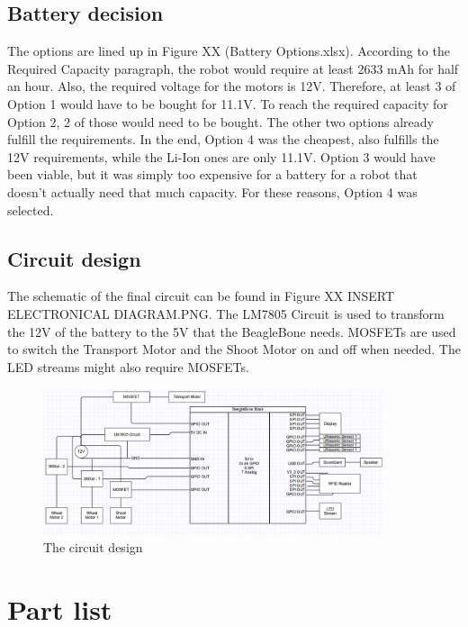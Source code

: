 \documentclass[11pt,twoside,a4paper]{report}
\begin{document}
\subsection{Battery decision}
The options are lined up in Figure XX (Battery Options.xlsx). According to the Required Capacity paragraph, the robot would require at least 2633 mAh for half an hour. Also, the required voltage for the motors is 12V. Therefore, at least 3 of Option 1 would have to be bought for 11.1V. To reach the required capacity for Option 2, 2 of those would need to be bought. The other two options already fulfill the requirements. 
In the end, Option 4 was the cheapest, also fulfills the 12V requirements, while the Li-Ion ones are only 11.1V. Option 3 would have been viable, but it was simply too expensive for a battery for a robot that doesn’t actually need that much capacity. 
For these reasons, Option 4 was selected. 
 \newpage
\subsection{Circuit design}
The schematic of the final circuit can be found in Figure XX INSERT ELECTRONICAL DIAGRAM.PNG. The LM7805 Circuit is used to transform the 12V of the battery to the 5V that the BeagleBone needs. MOSFETs are used to switch the Transport Motor and the Shoot Motor on and off when needed. The LED streams might also require MOSFETs. 
\begin{figure}[H]
\begin{center}
\includegraphics[width = 10cm]{Images/ElectronicalDiagram.png}
\caption{The circuit design}
\label{fig:electronics}
\end{center}
\end{figure}

\section{Part list}
\end{document}
